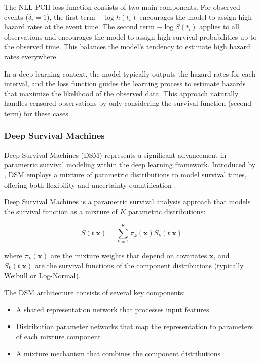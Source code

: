 The NLL-PCH loss function consists of two main components. For observed events ($\delta_i = 1$), the first term $-\log h(t_i)$ encourages the model to assign high hazard rates at the event time. The second term $-\log S(t_i)$ applies to all observations and encourages the model to assign high survival probabilities up to the observed time. This balances the model's tendency to estimate high hazard rates everywhere.

In a deep learning context, the model typically outputs the hazard rates for each interval, and the loss function guides the learning process to estimate hazards that maximize the likelihood of the observed data. This approach naturally handles censored observations by only considering the survival function (second term) for these cases.

\subsubsection{Deep Survival Machines}

Deep Survival Machines (DSM) represents a significant advancement in parametric survival modeling within the deep learning framework. Introduced by \textcite{nagpal2021dsm}, DSM employs a mixture of parametric distributions to model survival times, offering both flexibility and uncertainty quantification \parencite{mclachlan1988,bishop2006}.

\begin{definitionbox}[title=Deep Survival Machines]
  Deep Survival Machines is a parametric survival analysis approach that models the survival function as a mixture of $K$ parametric distributions:

  \begin{equation}
    S(t|\mathbf{x}) = \sum_{k=1}^K \pi_k(\mathbf{x}) S_k(t|\mathbf{x})
  \end{equation}

  where $\pi_k(\mathbf{x})$ are the mixture weights that depend on covariates $\mathbf{x}$, and $S_k(t|\mathbf{x})$ are the survival functions of the component distributions (typically Weibull or Log-Normal).
\end{definitionbox}

The DSM architecture consists of several key components:
\begin{itemize}
\item A shared representation network that processes input features
\item Distribution parameter networks that map the representation to parameters of each mixture component
\item A mixture mechanism that combines the component distributions
\end{itemize}

